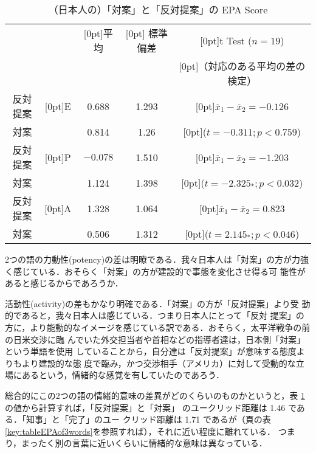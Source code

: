\documentclass[japanese]{jnlp_1.3d}
\begin{document}
\begin{table}[t]
 \caption{（日本人の）「対案」と「反対提案」の EPA Score} \label{key:tableEPAScore2words}
 \begin{center}
  \begin{tabular}{|c|c|ccc|} \hline
            &   & \raisebox{-1.5ex}[0pt]{平均} & \raisebox{-1.5ex}[0pt]
   {標準偏差} & \raisebox{-1.0ex}[0pt]{t Test {\footnotesize($n=19$)}} \\ 
   & & & &\raisebox{1.0ex}[0pt]{\scriptsize{（対応のある平均の差の検定）}} \\ \hline
   反対提案 &{\raisebox{-1.5ex}[0pt]{E}} & 0.688 & 1.293 &
   {\raisebox{-0.5ex}[0pt]{$\overline{x}_1 - \overline{x}_2 = -0.126$}}\\
   対案     &   & 0.814 & 1.26 & {\raisebox{0.5ex}[0pt]{($t=-0.311; p<0.759$)}}\\ \hline
   反対提案 &{\raisebox{-1.5ex}[0pt]{P}} & $-0.078$ & 1.510 & {\raisebox{-0.5ex}[0pt]{$\overline{x}_1 - \overline{x}_2 = -1.203$}}\\
   対案     &   & 1.124 & 1.398 & {\raisebox{0.5ex}[0pt]{($t=-2.325_*; p<0.032$)}}\\ \hline
   反対提案 &{\raisebox{-1.5ex}[0pt]{A}} & 1.328 & 1.064 & {\raisebox{-0.5ex}[0pt]{$\overline{x}_1 - \overline{x}_2 = 0.823$}}\\
   対案     &   & 0.506 & 1.312 & {\raisebox{0.5ex}[0pt]{($t=2.145_*; p<0.046$)}}\\ \hline
  \end{tabular}
 \end{center}
\hspace{3cm}{\footnotesize $_*$は5\%水準で有意．}
\end{table}

2つの語の力動性(potency)の差は明瞭である．我々日本人は「対案」の方が力強
く感じている．おそらく「対案」の方が建設的で事態を変化させ得る可
能性があると感じるからであろうか．

活動性(activity)の差もかなり明確である．「対案」の方が「反対提案」より受
動的であると，我々日本人は感じている．つまり日本人にとって「反対
提案」の方に，より能動的なイメージを感じている訳である．おそらく，太平洋戦争の前の日米交渉に臨
んでいた外交担当者や首相などの指導者達は，日本側「対案」という単語を使用
していることから，自分達は「反対提案」が意味する態度よりもより建設的な態
度で臨み，かつ交渉相手（アメリカ）に対して受動的な立場にあるという，情緒的な感覚を有していたのであろう．


総合的にこの2つの語の情緒的意味の差異がどのくらいのものかというと，表
\ref{key:tableEPAScore2words}の値から計算すれば，「反対提案」と「対案」
のユークリッド距離は 1.46 である．「知事」と「完了」のユー
クリッド距離は 1.71 であるが（\pageref{key:tableEPAof3words}頁の表
\ref{key:tableEPAof3words}を参照すれば），それに近い程度に離れている．
つまり，まったく別の言葉に近いくらいに情緒的な意味は異なっている．
\end{document}
